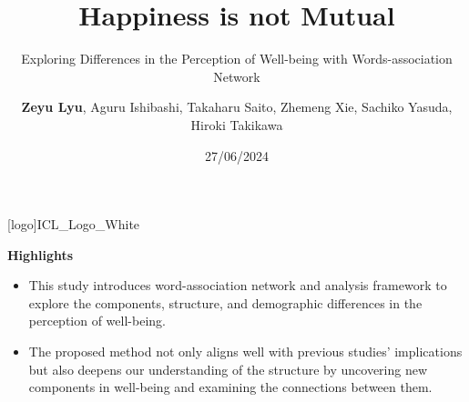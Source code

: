 \documentclass[
	aspectratio=169, %
	t, %
	onlytextwidth, %
	10pt, %
]{beamer}
\title{Happiness is not Mutual} %
\subtitle{Exploring Differences in the Perception of Well-being with Words-association Network} %
\author{\textbf{Zeyu Lyu}, Aguru Ishibashi, Takaharu Saito, Zhemeng Xie, Sachiko Yasuda, Hiroki Takikawa} %
\date{27/06/2024} %
\begin{document}




\begingroup
	[logo]{ICL_Logo_White} %
	\frame[plain, s]{\titlepage} %
\endgroup




\begingroup
	
	\begin{frame}
        \HUGE\textbf{Highlights}
        \begin{itemize}
            \item \Large This study introduces word-association network and analysis framework to explore the components, structure, and demographic differences in the perception of well-being.
            \vspace{0.75cm}
            \item \Large The proposed method not only aligns well with previous studies' implications but also deepens our understanding of the structure by uncovering new components in well-being and examining the connections between them.
        \end{itemize}
	\end{frame}
\endgroup

\end{document}

